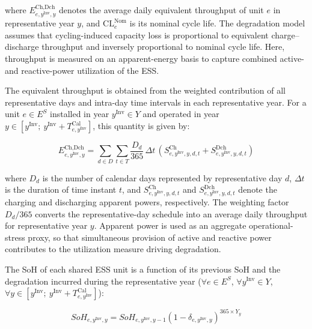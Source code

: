 \documentclass[preprint,12pt]{elsarticle}
\begin{document}
\noindent
where $E^{\text{Ch,Dch}}_{e,y^\text{Inv},y}$ denotes the average daily equivalent throughput of unit $e$ in representative year $y$, and $\mathrm{CL}^\text{Nom}_e$ is its nominal cycle life. The degradation model assumes that cycling-induced capacity loss is proportional to equivalent charge--discharge throughput and inversely proportional to nominal cycle life. Here, throughput is measured on an apparent-energy basis to capture combined active- and reactive-power utilization of the ESS.

The equivalent throughput is obtained from the weighted contribution of all representative days and intra-day time intervals in each representative year. For a unit $e \in E^S$ installed in year $y^\text{Inv} \in Y$ and operated in year $y \in [y^\text{Inv};~y^\text{Inv}+T^\text{Cal}_{e,y^\text{Inv}}]$, this quantity is given by:

\begin{equation}
    E^{\text{Ch,Dch}}_{e,y^\text{Inv},y} = 
    \sum_{d \in D} \sum_{t \in T} 
    \frac{D_d}{365} \, \Delta t \,
    \left(
        S^\text{Ch}_{e,y^\text{Inv},y,d,t}
        + 
        S^\text{Dch}_{e,y^\text{Inv},y,d,t}
    \right)
\end{equation}

\noindent
where 
$D_d$ is the number of calendar days represented by representative day $d$, 
$\Delta t$ is the duration of time instant $t$, and 
$S^\text{Ch}_{e,y^\text{Inv},y,d,t}$ and $S^\text{Dch}_{e,y^\text{Inv},y,d,t}$ denote the charging and discharging apparent powers, respectively. 
The weighting factor $D_d/365$ converts the representative-day schedule into an average daily throughput for representative year $y$. Apparent power is used as an aggregate operational-stress proxy, so that simultaneous provision of active and reactive power contributes to the utilization measure driving degradation. 

The SoH of each shared ESS unit is a function of its previous SoH and the degradation incurred during the representative year ($\forall e \in E^S$, $\forall y^\text{Inv} \in Y$, $\forall y \in [y^\text{Inv};~y^\text{Inv}+T^\text{Cal}_{e,y^\text{Inv}}]$):

\begin{equation}
    SoH_{e,y^\text{Inv},y} = SoH_{e,y^\text{Inv},y - 1} \left( 1 - \delta_{e,y^\text{Inv},y} \right)^{365 \times Y_y}
    \label{eq:soh_definition}
\end{equation}
\end{document}
